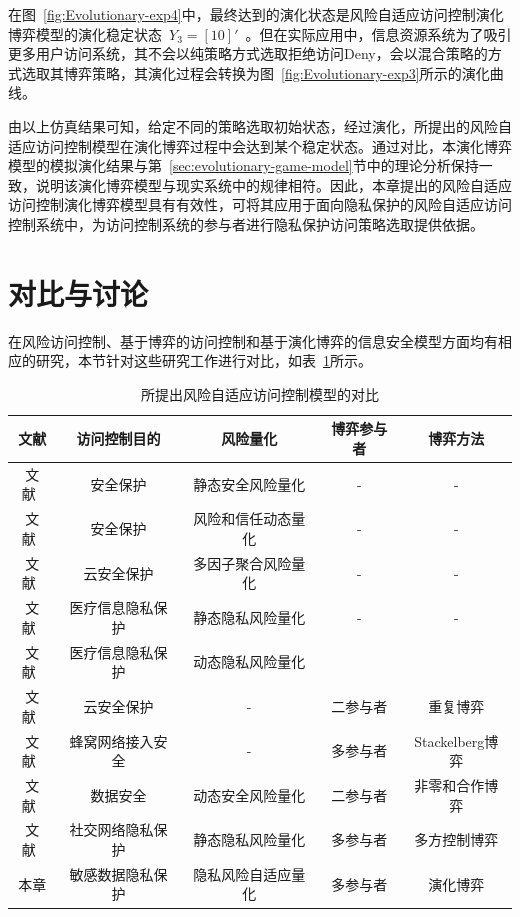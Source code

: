 \begin{enumerate}
 	在图~\ref{fig:Evolutionary-exp4}中，最终达到的演化状态是风险自适应访问控制演化博弈模型的演化稳定状态~${{Y}_{3}}=[10]'$~。但在实际应用中，信息资源系统为了吸引更多用户访问系统，其不会以纯策略方式选取拒绝访问Deny，会以混合策略的方式选取其博弈策略，其演化过程会转换为图~\ref{fig:Evolutionary-exp3}所示的演化曲线。
 \end{enumerate}


 由以上仿真结果可知，给定不同的策略选取初始状态，经过演化，所提出的风险自适应访问控制模型在演化博弈过程中会达到某个稳定状态。通过对比，本演化博弈模型的模拟演化结果与第~\ref{sec:evolutionary-game-model}节中的理论分析保持一致，说明该演化博弈模型与现实系统中的规律相符。因此，本章提出的风险自适应访问控制演化博弈模型具有有效性，可将其应用于面向隐私保护的风险自适应访问控制系统中，为访问控制系统的参与者进行隐私保护访问策略选取提供依据。
 
 \section{对比与讨论}
 
 在风险访问控制、基于博弈的访问控制和基于演化博弈的信息安全模型方面均有相应的研究，本节针对这些研究工作进行对比，如表~\ref{tab:game-model-comparision}所示。
\begin{table}[htbp]
	\caption{所提出风险自适应访问控制模型的对比}
	\label{tab:game-model-comparision}
	\centering
	\begin{tabular}{ccccc}%
		
		\toprule
		文献  &	访问控制目的&	风险量化&	博弈参与者&	博弈方法\\
		\midrule
		文献~\cite{ni2010risk}&
		安全保护&	静态安全风险量化&	-&	-\\
		文献~\cite{shaikh2012dynamic}&
		安全保护&	风险和信任动态量化&	-&	-\\
		文献~\cite{santos2016framework}&
		云安全保护&	多因子聚合风险量化&	-&	-\\
		文献~\cite{wang2011quantified}&
		医疗信息隐私保护&	静态隐私风险量化&	-&	-\\
		文献~\cite{zhang2018privacy}&
		医疗信息隐私保护&	动态隐私风险量化\\		
		文献~\cite{gao2018game}&
		云安全保护&	-&	二参与者&	重复博弈\\
		文献~\cite{liu2016dynamic}&
		蜂窝网络接入安全&	-	&多参与者&	Stackelberg博弈\\
		文献~\cite{helil2017non}&
		数据安全&	动态安全风险量化&	二参与者&	非零和合作博弈\\
		文献~\cite{hu2014game}&
		社交网络隐私保护&	静态隐私风险量化&	多参与者&	多方控制博弈\\
		本章&	敏感数据隐私保护&	隐私风险自适应量化&	多参与者&	演化博弈\\
	
		\bottomrule
	\end{tabular}
\end{table}

